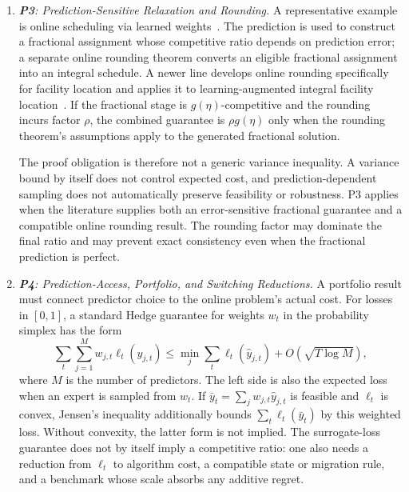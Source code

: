 \documentclass[acmsmall,screen,nonacm]{acmart}
\theoremstyle{acmdefinition}%
\begin{document}
\begin{enumerate}
    \item \emph{\textbf{P3}: Prediction-Sensitive Relaxation and Rounding.}
    A representative example is online scheduling via learned weights~\cite{lattanzi2020online}. The prediction is used to construct a fractional assignment whose competitive ratio depends on prediction error; a separate online rounding theorem converts an eligible fractional assignment into an integral schedule. A newer line develops online rounding specifically for facility location and applies it to learning-augmented integral facility location~\cite{lattanzi2026facility}. If the fractional stage is $g(\eta)$-competitive and the rounding incurs factor $\rho$, the combined guarantee is $\rho g(\eta)$ only when the rounding theorem's assumptions apply to the generated fractional solution.

    The proof obligation is therefore not a generic variance inequality. A variance bound by itself does not control expected cost, and prediction-dependent sampling does not automatically preserve feasibility or robustness. P3 applies when the literature supplies both an error-sensitive fractional guarantee and a compatible online rounding result. The rounding factor may dominate the final ratio and may prevent exact consistency even when the fractional prediction is perfect.

    \item \emph{\textbf{P4}: Prediction-Access, Portfolio, and Switching Reductions.}
    A portfolio result must connect predictor choice to the online problem's actual cost. For losses in $[0,1]$, a standard Hedge guarantee for weights $w_t$ in the probability simplex has the form
    \begin{equation}
       \sum_t\sum_{j=1}^{M}w_{j,t}\ell_t(\hat y_{j,t})
       \leq \min_j\sum_t\ell_t(\hat y_{j,t})+O(\sqrt{T\log M}),
    \end{equation}
    where $M$ is the number of predictors. The left side is also the expected loss when an expert is sampled from $w_t$. If $\bar y_t=\sum_jw_{j,t}\hat y_{j,t}$ is feasible and $\ell_t$ is convex, Jensen's inequality additionally bounds $\sum_t\ell_t(\bar y_t)$ by this weighted loss. Without convexity, the latter form is not implied. The surrogate-loss guarantee does not by itself imply a competitive ratio: one also needs a reduction from $\ell_t$ to algorithm cost, a compatible state or migration rule, and a benchmark whose scale absorbs any additive regret.


\end{enumerate}
\end{document}
